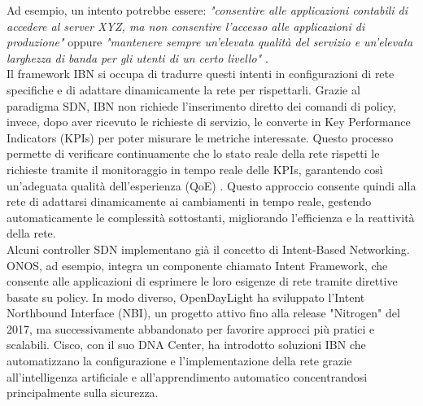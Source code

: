 Ad esempio, un intento potrebbe essere: \textit{"consentire alle applicazioni contabili di accedere al server XYZ, ma non consentire l’accesso alle applicazioni di produzione"} oppure
\textit{"mantenere sempre un'elevata qualità del servizio e un'elevata larghezza di banda per gli utenti di un certo livello"} \cite{esempint}.
\\Il framework IBN si occupa di tradurre questi intenti
in configurazioni di rete specifiche e di adattare dinamicamente la rete per rispettarli. %
Grazie al paradigma SDN, IBN non richiede l'inserimento diretto dei comandi di policy, invece, dopo aver ricevuto le richieste di servizio, le converte in Key Performance Indicators (KPIs) per poter misurare le metriche interessate.
Questo processo permette di verificare continuamente che lo stato reale della rete rispetti le richieste tramite il monitoraggio in tempo reale delle KPIs, garantendo così un'adeguata qualità dell'esperienza (QoE) \cite{qoe}.
Questo approccio consente quindi alla rete di adattarsi dinamicamente ai cambiamenti in tempo reale, gestendo automaticamente le complessità sottostanti, migliorando l'efficienza e la reattività della rete.
\\Alcuni controller SDN implementano già il concetto di Intent-Based Networking. 
\\ONOS, ad esempio, integra un componente chiamato Intent Framework, che consente alle applicazioni di esprimere le loro esigenze di rete tramite direttive basate su policy. 
In modo diverso, OpenDayLight ha sviluppato l'Intent Northbound Interface (NBI), un progetto attivo fino alla release "Nitrogen" del 2017, ma successivamente abbandonato per favorire approcci più pratici e scalabili. 
Cisco, con il suo DNA Center, ha introdotto soluzioni IBN che automatizzano la configurazione e l'implementazione della rete grazie all'intelligenza artificiale e all'apprendimento automatico concentrandosi principalmente sulla sicurezza. 
